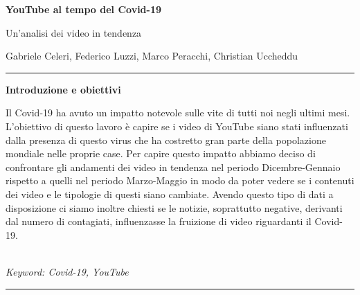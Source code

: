 \documentclass[10pt, a4paper,openany]{article}
\begin{document}
\begin{center}
\huge\textbf{YouTube al tempo del Covid-19}

Un'analisi dei video in tendenza
\end{center}

\begin{center}
Gabriele Celeri, Federico Luzzi,  Marco Peracchi, Christian Uccheddu
\end{center}

\hrule
\vspace{0.2cm}
\begin{center}\textbf{Introduzione e obiettivi}\end{center} 
Il Covid-19 ha avuto un impatto notevole sulle vite di tutti noi negli ultimi mesi. L'obiettivo di questo lavoro è capire se i video di YouTube siano stati influenzati dalla presenza di questo virus che ha costretto gran parte della popolazione mondiale nelle proprie case. 
Per capire questo impatto abbiamo deciso di confrontare gli andamenti dei video in tendenza nel periodo Dicembre-Gennaio rispetto a quelli nel periodo Marzo-Maggio in modo da poter vedere se i contenuti dei video e le tipologie di questi siano cambiate. 
Avendo questo tipo di dati a disposizione ci siamo inoltre chiesti se le notizie, soprattutto negative, derivanti dal numero di contagiati, influenzasse la fruizione di video riguardanti il Covid-19.
\\\\ \begin{small}
	\textit{Keyword: Covid-19, YouTube}
\end{small}
\vspace{0.2cm}
\hrule



  
\end{document}

